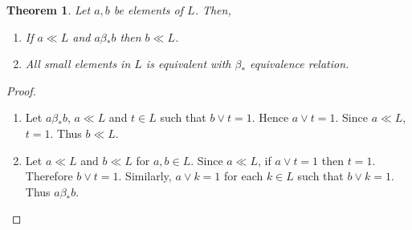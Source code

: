 \documentclass[11pt,reqno]{amsart} %
\theoremstyle{plain}
\newtheorem{theorem}{Theorem}
\theoremstyle{definition}
\theoremstyle{remark}
\numberwithin{equation}{section}
\begin{document}
\begin{theorem} \label{4}
  Let $ a,b $ be elements of $ L $. Then,
  \begin{enumerate}[label=\textnormal{(\arabic*)}]

    \item
      If $ a \ll L $ and $ a \beta_* b $ then $ b \ll L $.
    \item \label{4.2}
      All small elements in $ L $ is equivalent with $ \beta_* $ equivalence relation.
  \end{enumerate}
\end{theorem}

\begin{proof}
  \begin{enumerate}
    \item
      Let $ a \beta_* b $, $ a \ll L $ and $ t \in L $ such that $ b \vee t = 1 $. 
      Hence $ a \vee t = 1 $. Since $ a \ll L $, $ t = 1 $. Thus $ b \ll L $. 
    \item
      Let $ a \ll L $ and $ b \ll L $ for $ a,b \in L $. Since $ a \ll L $, if $ a \vee t = 1 $ 
      then $ t = 1 $. Therefore $ b \vee t = 1 $. 
      Similarly, $ a \vee k = 1 $ for each $ k \in L $ such that $ b \vee k = 1 $. 
      Thus $ a \beta_* b $. 
  \end{enumerate}
\end{proof}
\end{document}

